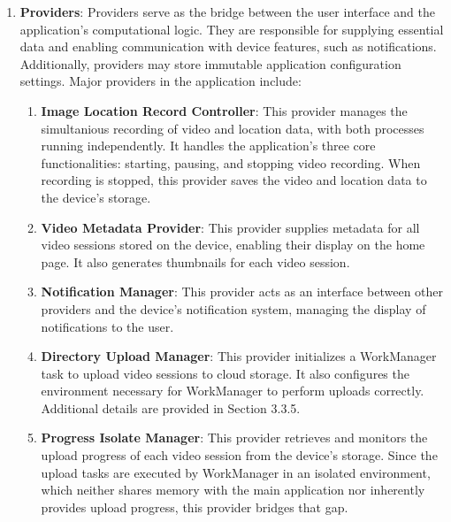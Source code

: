 \begin{enumerate}
    \item \textbf{Providers}: Providers serve as the bridge between the user interface and the application's computational logic. They are responsible for supplying essential data and enabling communication with device features, such as notifications. Additionally, providers may store immutable application configuration settings. Major providers in the application include:
    \begin{enumerate}
        \item \textbf{Image Location Record Controller}: This provider manages the simultanious recording of video and location data, with both processes running independently. It handles the application's three core functionalities: starting, pausing, and stopping video recording. When recording is stopped, this provider saves the video and location data to the device's storage.
        \item \textbf{Video Metadata Provider}: This provider supplies metadata for all video sessions stored on the device, enabling their display on the home page. It also generates thumbnails for each video session.  
        \item \textbf{Notification Manager}: This provider acts as an interface between other providers and the device's notification system, managing the display of notifications to the user.  
        \item \textbf{Directory Upload Manager}: This provider initializes a WorkManager task to upload video sessions to cloud storage. It also configures the environment necessary for WorkManager to perform uploads correctly. Additional details are provided in Section 3.3.5. %
        \item \textbf{Progress Isolate Manager}: This provider retrieves and monitors the upload progress of each video session from the device's storage. Since the upload tasks are executed by WorkManager in an isolated environment, which neither shares memory with the main application nor inherently provides upload progress, this provider bridges that gap.
    \end{enumerate}
    

\end{enumerate}

